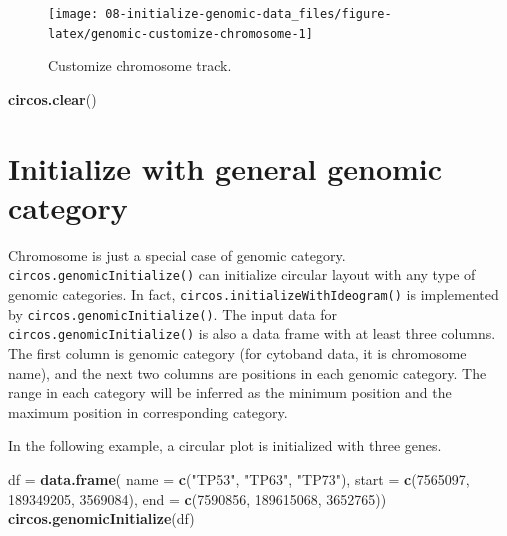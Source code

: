 \documentclass[]{book}
\newenvironment{Shaded}{\begin{snugshade}}{\end{snugshade}}
\newcommand{\KeywordTok}[1]{\textcolor[rgb]{0.13,0.29,0.53}{\textbf{#1}}}
\newcommand{\DataTypeTok}[1]{\textcolor[rgb]{0.13,0.29,0.53}{#1}}
\newcommand{\DecValTok}[1]{\textcolor[rgb]{0.00,0.00,0.81}{#1}}
\newcommand{\StringTok}[1]{\textcolor[rgb]{0.31,0.60,0.02}{#1}}
\newcommand{\NormalTok}[1]{#1}
\theoremstyle{definition}
\theoremstyle{definition}
\theoremstyle{remark}
\begin{document}
\begin{figure}

{\centering \texttt{[image: 08-initialize-genomic-data\_files/figure-latex/genomic-customize-chromosome-1]} 

}

\caption{Customize chromosome track.}\label{fig:genomic-customize-chromosome}
\end{figure}

\begin{Shaded}
\begin{Highlighting}[]
\KeywordTok{circos.clear}\NormalTok{()}
\end{Highlighting}
\end{Shaded}

\section{Initialize with general genomic
category}\label{initialize-with-general-genomic-category}

Chromosome is just a special case of genomic category.
\texttt{circos.genomicInitialize()} can initialize circular layout with
any type of genomic categories. In fact,
\texttt{circos.initializeWithIdeogram()} is implemented by
\texttt{circos.genomicInitialize()}. The input data for
\texttt{circos.genomicInitialize()} is also a data frame with at least
three columns. The first column is genomic category (for cytoband data,
it is chromosome name), and the next two columns are positions in each
genomic category. The range in each category will be inferred as the
minimum position and the maximum position in corresponding category.

In the following example, a circular plot is initialized with three
genes.

\begin{Shaded}
\begin{Highlighting}[]
\NormalTok{df =}\StringTok{ }\KeywordTok{data.frame}\NormalTok{(}
    \DataTypeTok{name  =} \KeywordTok{c}\NormalTok{(}\StringTok{"TP53"}\NormalTok{,  }\StringTok{"TP63"}\NormalTok{,    }\StringTok{"TP73"}\NormalTok{),}
    \DataTypeTok{start =} \KeywordTok{c}\NormalTok{(}\DecValTok{7565097}\NormalTok{, }\DecValTok{189349205}\NormalTok{, }\DecValTok{3569084}\NormalTok{),}
    \DataTypeTok{end   =} \KeywordTok{c}\NormalTok{(}\DecValTok{7590856}\NormalTok{, }\DecValTok{189615068}\NormalTok{, }\DecValTok{3652765}\NormalTok{))}
\KeywordTok{circos.genomicInitialize}\NormalTok{(df)}
\end{Highlighting}
\end{Shaded}
\end{document}
